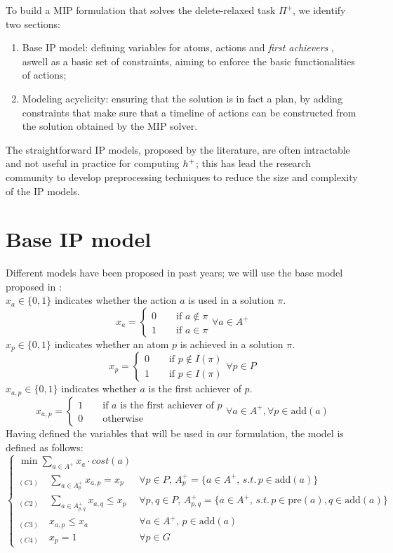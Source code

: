 To build a MIP formulation that solves the delete-relaxed task $\Pi^+$, we identify two sections:
\begin{enumerate}
    \item Base IP model: defining variables for atoms, actions and \textit{first achievers} \cite{Imai_15}, aswell as a basic set of constraints, aiming to enforce the basic functionalities of actions;
    \item Modeling acyclicity: ensuring that the solution is in fact a plan, by adding constraints that make sure that a timeline of actions can be constructed from the solution obtained by the MIP solver.
\end{enumerate}
The straightforward IP models, proposed by the literature, are often intractable and not useful in practice for computing $h^+$; this has lead the research community to develop preprocessing techniques to reduce the size and complexity of the IP models.

\section{Base IP model}
Different models have been proposed in past years; we will use the base model proposed in \cite{Rankooh_22}:\\
$x_a\in\{0,1\}$ indicates whether the action $a$ is used in a solution $\pi$.
$$x_a=
\begin{cases}
    0\qquad\mbox{if }a\not\in\pi\\
    1\qquad\mbox{if }a\in\pi
\end{cases}\forall a\in A^+
$$
$x_p\in\{0,1\}$ indicates whether an atom $p$ is achieved in a solution $\pi$.
$$x_p=
\begin{cases}
    0\qquad\mbox{if }p\not\in I(\pi)\\
    1\qquad\mbox{if }p\in I(\pi)
\end{cases}\forall p\in P
$$
$x_{a,p}\in\{0,1\}$ indicates whether $a$ is the first achiever of $p$.
$$x_{a,p}=
\begin{cases}
    1\qquad\mbox{if }a\mbox{ is the first achiever of }p\\
    0\qquad\mbox{otherwise}
\end{cases}\forall a\in A^+,\forall p\in \mbox{add}(a)
$$
Having defined the variables that will be used in our formulation, the model is defined as follows:
$$
\begin{cases}
    \displaystyle\min\sum_{ a\in A^+}x_a\cdot cost(a)\\
    \displaystyle_{(C1)}\quad\sum_{a\in A^+_p}x_{a,p}=x_p&\forall p\in P,\,A^+_p=\{a\in A^+,\,s.t.\,p\in \mbox{add}(a)\}\\
    \displaystyle_{(C2)}\quad\sum_{a\in A^+_{p,q}}x_{a,q}\leq x_p&\forall p,q\in P,\,A^+_{p,q}=\{a\in A^+,\,s.t.\,p\in \mbox{pre}(a),q\in \mbox{add}(a)\}\\
    _{(C3)}\quad x_{a,p}\leq x_a&\forall a\in A^+,\,p\in \mbox{add}(a)\\
    _{(C4)}\quad x_p=1&\forall p\in G
\end{cases}
$$

